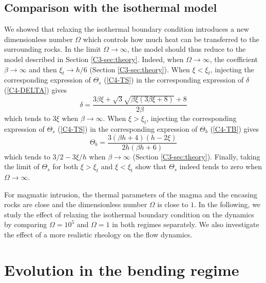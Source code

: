 \subsection{Comparison with the isothermal model}
\label{C4-sec:some-limits}

We showed that relaxing the isothermal boundary condition introduces a
new dimensionless number $\Omega$ which  controls how much heat can be
transferred    to   the    surrounding    rocks.     In   the    limit
$\Omega \rightarrow \infty$, the model should thus reduce to the model
described     in    Section     \ref{C3-sec:theory}.     Indeed,     when
$\Omega\rightarrow \infty$, the  coefficient $\beta\rightarrow \infty$
and  then  $\xi_t\rightarrow  h/6$ (Section  \ref{C3-sec:theory}).   When
$\xi<\xi_t$,  injecting  the  corresponding expression  of  $\Theta_s$
(\ref{C4-TS})   in   the    corresponding   expression   of   $\delta$
(\ref{C4-DELTA}) gives
\begin{equation}
  \delta =\frac{3 \beta \xi +\sqrt{3} \sqrt{\beta \xi (3 \beta \xi +8)}+8}{2 \beta }
\end{equation}
which  tends   to  $3\xi$  when  $\beta   \rightarrow  \infty$.   When
$\xi>\xi_t$,  injecting  the  corresponding expression  of  $\Theta_s$
(\ref{C4-TS})   in   the   corresponding  expression   of   $\Theta_b$
(\ref{C4-TB}) gives
\begin{equation}
  \Theta_b = \frac{3 (\beta  h+4) (h-2 \xi )}{2 h (\beta  h+6)}
\end{equation}
which tends  to $3/2-3\xi/h$ when $\beta  \rightarrow \infty$ (Section
\ref{C3-sec:theory}). Finally,  taking the  limit of $\Theta_s$  for both
$\xi>\xi_t$ and $\xi<\xi_t$ show that  $\Theta_s$ indeed tends to zero
when $\Omega\rightarrow \infty$.

For magmatic  intrusion, the thermal  parameters of the magma  and the
encasing  rocks are  close and  the dimensionless  number $\Omega$  is
close to  $1$. In the following,  we study the effect  of relaxing the
isothermal   boundary  condition   on   the   dynamics  by   comparing
$\Omega=10^5$ and  $\Omega = 1$  in both regimes separately.   We also
investigate  the effect  of  a  more realistic  rheology  on the  flow
dynamics. 

\section{Evolution in the bending regime}
\label{C4-sec:evol-bend-regime-1}

